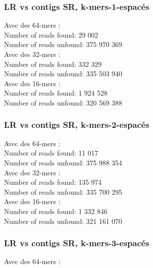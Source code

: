 \documentclass[12pt]{article}
\begin{document}
\subsubsection{LR vs contigs SR, k-mers-1-espacés}

Avec des 64-mers : \\

Number of reads found: 29 002 \\
Number of reads unfound: 375 970 369 \\

Avec des 32-mers : \\

Number of reads found: 332 329 \\
Number of reads unfound: 335 503 940 \\

Avec des 16-mers : \\

Number of reads found: 1 924 528 \\
Number of reads unfound: 320 569 388 \\

\subsubsection{LR vs contigs SR, k-mers-2-espacés}

Avec des 64-mers : \\

Number of reads found: 11 017 \\
Number of reads unfound: 375 988 354 \\

Avec des 32-mers : \\

Number of reads found: 135 974 \\
Number of reads unfound: 335 700 295 \\

Avec des 16-mers : \\

Number of reads found: 1 332 846 \\
Number of reads unfound: 321 161 070 \\

\subsubsection{LR vs contigs SR, k-mers-3-espacés}

Avec des 64-mers : \\
\end{document}
